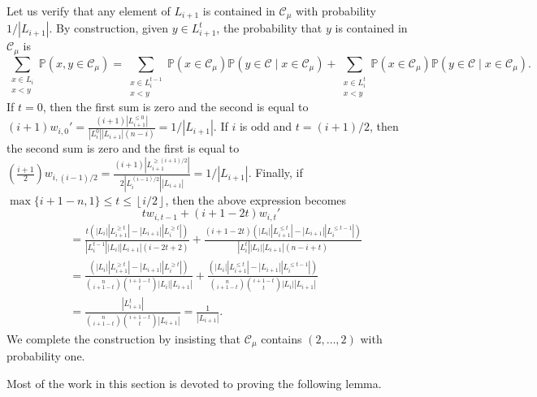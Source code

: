 \documentclass[11 pt]{article}
\theoremstyle{definition}
\theoremstyle{case}
\numberwithin{equation}{section}
\begin{document}
Let us verify that any element of $L_{i+1}$ is contained in $\mathcal{C}_\mu$ with probability $1/|L_{i+1}|$. By construction, given $y\in L_{i+1}^t$, the probability that $y$ is contained in $\mathcal{C}_\mu$ is
\[\sum_{\substack{x\in L_i \\ x<y}}\mathbb{P}\left(x,y\in\mathcal{C}_\mu\right) = \sum_{\substack{x\in L_i^{t-1} \\ x<y}}\mathbb{P}\left(x\in\mathcal{C}_\mu\right)\mathbb{P}\left(y\in\mathcal{C}\mid x\in\mathcal{C}_\mu\right)+\sum_{\substack{x\in L_i^{t} \\ x<y}}\mathbb{P}\left(x\in\mathcal{C}_\mu\right)\mathbb{P}\left(y\in\mathcal{C}\mid x\in\mathcal{C}_\mu\right).\]
If $t=0$, then the first sum is zero and the second is equal to $(i+1)w_{i,0}'=\frac{(i+1)\left|L_{i+1}^{\leq 0}\right|}{\left|L_i^0\right||L_{i+1}|(n-i)} = 1/|L_{i+1}|$. If $i$ is odd and $t=(i+1)/2$, then the second sum is zero and the first is equal to $\left(\frac{i+1}{2}\right)w_{i,(i-1)/2}= \frac{(i+1)\left|L_{i+1}^{\geq (i+1)/2}\right|}{2\left|L_i^{(i-1)/2}\right||L_{i+1}|} = 1/|L_{i+1}|$. Finally, if $\max\{i+1-n,1\} \leq t\leq \left\lfloor i/2\right\rfloor$, then the above expression becomes
\[tw_{i,t-1} + (i+1-2t)w_{i,t}'\]
\begin{align*}
&= \frac{t\left(\left|L_i\right|\left|L_{i+1}^{\geq t}\right| - \left|L_{i+1}\right|\left|L_i^{\geq t}\right|\right)}{\left|L_i^{t-1}\right|\left|L_i\right|\left|L_{i+1}\right|(i-2t+2)} + \frac{(i+1-2t)\left(\left|L_i\right|\left|L_{i+1}^{\leq t}\right| - \left|L_{i+1}\right|\left|L_i^{\leq t-1}\right| \right)}{\left|L_i^t\right|\left|L_i\right|\left|L_{i+1}\right|(n-i+t)}\\
&= \frac{\left(\left|L_i\right|\left|L_{i+1}^{\geq t}\right| - \left|L_{i+1}\right|\left|L_i^{\geq t}\right|\right)}{\binom{n}{i+1-t}\binom{i+1-t}{t}\left|L_i\right|\left|L_{i+1}\right|} + \frac{\left(\left|L_i\right|\left|L_{i+1}^{\leq t}\right| - \left|L_{i+1}\right|\left|L_i^{\leq t-1}\right| \right)}{\binom{n}{i+1-t}\binom{i+1-t}{t}\left|L_i\right|\left|L_{i+1}\right|}\\
&=\frac{|L_{i+1}^t|}{\binom{n}{i+1-t}\binom{i+1-t}{t}|L_{i+1}|}=\frac{1}{\left|L_{i+1}\right|}.\end{align*}
We complete the construction by insisting that $\mathcal{C}_\mu$ contains $(2,\dots,2)$ with probability one. 

Most of the work in this section is devoted to proving the following lemma. 
\end{document}
